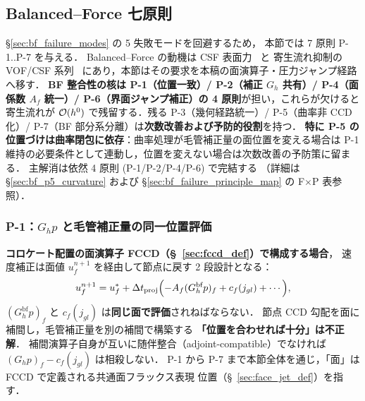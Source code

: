%
%
\subsection{Balanced--Force 七原則}
\label{sec:bf_seven_principles}

§\ref{sec:bf_failure_modes} の 5 失敗モードを回避するため，
本節では 7 原則 P-1..P-7 を与える．
Balanced--Force の動機は CSF 表面力~\cite{Brackbill1992} と
寄生流れ抑制の VOF/CSF 系列~\cite{Francois2006,Popinet2009,DennerVanWachem2015}
にあり，本節はその要求を本稿の面演算子・圧力ジャンプ経路へ移す．
\textbf{BF 整合性の核は P-1（位置一致）/ P-2（補正 $G_h$ 共有）/ P-4（面係数 $A_f$ 統一）/
P-6（界面ジャンプ補正）の 4 原則}が担い，これらが欠けると寄生流れが
$\mathcal{O}(h^0)$ で残留する．残る P-3（幾何経路統一）/ P-5（曲率非 CCD 化）/
P-7（BF 部分系分離）は\textbf{次数改善および予防的役割}を持つ．
\textbf{特に P-5 の位置づけは曲率閉包に依存}：曲率処理が毛管補正量の面位置を変える場合は
P-1 維持の必要条件として連動し，位置を変えない場合は次数改善の予防策に留まる．
主解消は依然 4 原則 (P-1/P-2/P-4/P-6) で完結する
（詳細は §\ref{sec:bf_p5_curvature} および §\ref{sec:bf_failure_principle_map} の F$\times$P 表参照）．

\subsubsection{\texorpdfstring{P-1：$G_h p$ と毛管補正量の同一位置評価}{P-1：Gh p と毛管補正量の同一位置評価}}
\label{sec:bf_p1_location}

\textbf{コロケート配置の面演算子 FCCD（§~\ref{sec:fccd_def}）で構成する場合}，
速度補正は面値 $u_f^{n+1}$ を経由して節点に戻す 2 段設計となる：
\begin{equation}
  u_f^{n+1} = u_f^* + \Delta t_{\mathrm{proj}}\Bigl(
    -A_f(G_h^\text{bf} p)_f + c_f(j_{gl}) + \cdots
  \Bigr),
  \label{eq:bf_p1_corrector}
\end{equation}
$(G_h^\text{bf} p)_f$ と $c_f(j_{gl})$ は\textbf{同じ面で評価}されねばならない．
節点 CCD 勾配を面に補間し，毛管補正量を別の補間で構築する
\textbf{「位置を合わせれば十分」は不正解}．
補間演算子自身が互いに随伴整合（adjoint-compatible）でなければ
$(G_h p)_f - c_f(j_{gl})$ は相殺しない．
P-1 から P-7 まで本節全体を通じ，「面」は FCCD で定義される共通面フラックス表現
位置（§~\ref{sec:face_jet_def}）を指す．

